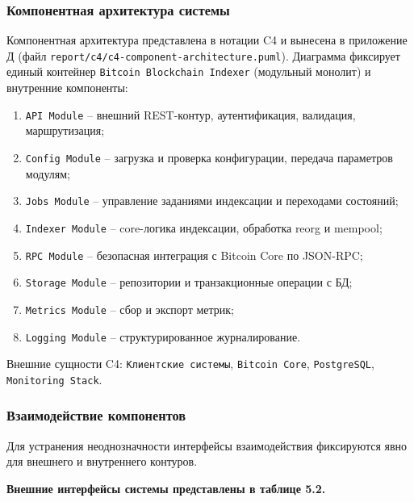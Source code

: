 ﻿\documentclass[14pt,a4paper]{extarticle}
\begin{document}
\subsubsection{Компонентная архитектура системы}
\noindent Компонентная архитектура представлена в нотации C4 и вынесена в приложение Д (файл \texttt{report/c4/c4-component-architecture.puml}). Диаграмма фиксирует единый контейнер \texttt{Bitcoin Blockchain Indexer} (модульный монолит) и внутренние компоненты:
\begin{enumerate}
  \item \texttt{API Module} -- внешний REST-контур, аутентификация, валидация, маршрутизация;
  \item \texttt{Config Module} -- загрузка и проверка конфигурации, передача параметров модулям;
  \item \texttt{Jobs Module} -- управление заданиями индексации и переходами состояний;
  \item \texttt{Indexer Module} -- core-логика индексации, обработка reorg и mempool;
  \item \texttt{RPC Module} -- безопасная интеграция с Bitcoin Core по JSON-RPC;
  \item \texttt{Storage Module} -- репозитории и транзакционные операции с БД;
  \item \texttt{Metrics Module} -- сбор и экспорт метрик;
  \item \texttt{Logging Module} -- структурированное журналирование.
\end{enumerate}
\noindent Внешние сущности C4: \texttt{Клиентские системы}, \texttt{Bitcoin Core}, \texttt{PostgreSQL}, \texttt{Monitoring Stack}.

\subsubsection{Взаимодействие компонентов}
\noindent Для устранения неоднозначности интерфейсы взаимодействия фиксируются явно для внешнего и внутреннего контуров.

\textbf{Внешние интерфейсы системы представлены в таблице 5.2.}
\end{document}
